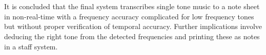 \\ \\
It is concluded that the final system transcribes single tone music to a note sheet in non-real-time with a frequency accuracy complicated for low frequency tones but without proper verification of temporal accuracy. Further implications involve deducing the right tone from the detected frequencies and printing these as notes in a staff system.

 